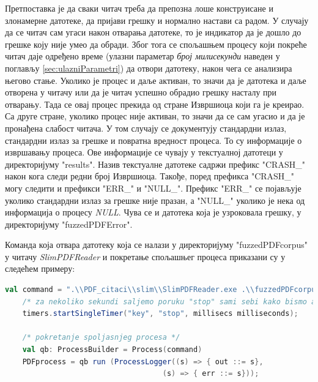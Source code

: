 \documentclass[12pt,oneside]{memoir}
\begin{document}
Претпоставка је да сваки читач треба да препозна лоше конструисане и злонамерне датотеке, да пријави грешку и нормално настави са радом. У случају да се читач сам угаси након отварања датотеке, то је индикатор да је дошло до грешке коју није умео да обради. Због тога се спољашњем процесу који покреће читач даје одређено време (улазни параметар \textit{број милисекунди} наведен у поглављу \ref{sec:ulazniParametri}) да отвори датотеку, након чега се анализира његово стање. Уколико је процес и даље активан, то значи да је датотека и даље отворена у читачу или да је читач успешно обрадио грешку насталу при отварању. Тада се овај процес прекида од стране Извршиоца који га је креирао. Са друге стране, уколико процес није активан, то значи да се сам угасио и да је пронађена слабост читача. У том случају се документују стандардни излаз, стандардни излаз за грешке и повратна вредност процеса. То су информације о извршавању процеса. Ове информације се чувају у текстуалној датотеци у директоријуму "results". Назив текстуалне датотеке садржи префикс "CRASH\_" након кога следи редни број Извршиоца. Такође, поред префикса "CRASH\_" могу следити и префикси "ERR\_" и "NULL\_". Префикс "ERR\_" се појављује уколико стандардни излаз за грешке није празан, а "NULL\_" уколико је нека од информација о процесу \textit{NULL}. Чува се и датотека која је узроковала грешку, у директоријуму "fuzzedPDFError".

Команда која отвара датотеку која се налази у директоријуму "fuzzedPDFcorpus" у читачу \textit{SlimPDFReader} и покретање спољашњег процеса приказани су у следећем примеру:

\begin{lstlisting}[frame=single, language=Scala]
    val command = ".\\PDF_citaci\\slim\\SlimPDFReader.exe .\\fuzzedPDFcorpus\\" + numberComplete +               "_fuzzed.pdf";
    /* za nekoliko sekundi saljemo poruku "stop" sami sebi kako bismo analizirali stanje procesa */
    timers.startSingleTimer("key", "stop", millisecs milliseconds);

    /* pokretanje spoljasnjeg procesa */
    val qb: ProcessBuilder = Process(command)
    PDFprocess = qb run (ProcessLogger((s) => { out ::= s},
	    					        (s) => { err ::= s}));
\end{lstlisting}
\end{document}

